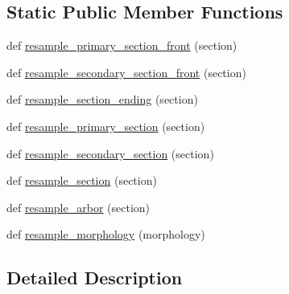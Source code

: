 \subsection*{Static Public Member Functions}
\begin{DoxyCompactItemize}
\item 
def \hyperlink{classmeshy_1_1neuromorphovis_1_1morphologies_1_1disconnected__morphology__resampler_1_1DisconnectedSkeletonResampler_a2931c905c0b91d3f431bb8f39249f535}{resample\+\_\+primary\+\_\+section\+\_\+front} (section)
\item 
def \hyperlink{classmeshy_1_1neuromorphovis_1_1morphologies_1_1disconnected__morphology__resampler_1_1DisconnectedSkeletonResampler_adc230f46411eb7f795fdf22295d0d3ef}{resample\+\_\+secondary\+\_\+section\+\_\+front} (section)
\item 
def \hyperlink{classmeshy_1_1neuromorphovis_1_1morphologies_1_1disconnected__morphology__resampler_1_1DisconnectedSkeletonResampler_aeee85a7117449bd36ac0c788766dec41}{resample\+\_\+section\+\_\+ending} (section)
\item 
def \hyperlink{classmeshy_1_1neuromorphovis_1_1morphologies_1_1disconnected__morphology__resampler_1_1DisconnectedSkeletonResampler_a89e9eaacde30e86cdfb7927f8691cd16}{resample\+\_\+primary\+\_\+section} (section)
\item 
def \hyperlink{classmeshy_1_1neuromorphovis_1_1morphologies_1_1disconnected__morphology__resampler_1_1DisconnectedSkeletonResampler_aa996666eaf6622c54e71eb737aac8dd8}{resample\+\_\+secondary\+\_\+section} (section)
\item 
def \hyperlink{classmeshy_1_1neuromorphovis_1_1morphologies_1_1disconnected__morphology__resampler_1_1DisconnectedSkeletonResampler_a614897c9f6a5692b8b37e075f78f103b}{resample\+\_\+section} (section)
\item 
def \hyperlink{classmeshy_1_1neuromorphovis_1_1morphologies_1_1disconnected__morphology__resampler_1_1DisconnectedSkeletonResampler_a745dec247727af10e7e531ee621752a2}{resample\+\_\+arbor} (section)
\item 
def \hyperlink{classmeshy_1_1neuromorphovis_1_1morphologies_1_1disconnected__morphology__resampler_1_1DisconnectedSkeletonResampler_ad047009d72e02f50c06f0281e2dff87b}{resample\+\_\+morphology} (morphology)
\end{DoxyCompactItemize}


\subsection{Detailed Description}


